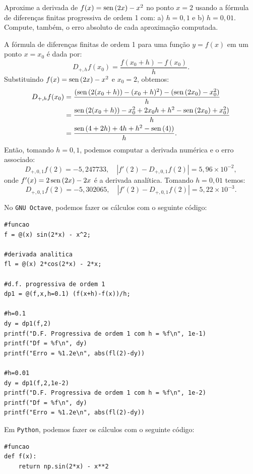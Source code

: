 \begin{exeresol}
Aproxime a derivada de $f(x)=\operatorname{sen}\,(2x) - x^2$ no ponto $x=2$ usando a fórmula de diferenças finitas progressiva de ordem 1 com: a) $h=0,1$ e b) $h=0,01$. Compute, também, o erro absoluto de cada aproximação computada.
\end{exeresol}
\begin{resol}
  A fórmula de diferenças finitas de ordem 1 para uma função $y = f(x)$ em um ponto $x = x_0$ é dada por:
  \begin{equation}
    D_{+,h}f(x_0) = \frac{f(x_0+h) - f(x_0)}{h}.
  \end{equation}
Substituindo $f(x) = \operatorname{sen}\,(2x) - x^2$ e $x_0 = 2$, obtemos:
  \begin{equation}
    \begin{split}
      D_{+,h}f(x_0) &= \frac{(\operatorname{sen}\,(2(x_0+h)) - (x_0+h)^2) - (\operatorname{sen}\,(2x_0) - x_0^2)}{h}\\
      &= \frac{\operatorname{sen}\,(2(x_0+h)) - x_0^2 + 2x_0h + h^2 - \operatorname{sen}\,(2x_0) + x_0^2)}{h}\\
      &= \frac{\operatorname{sen}\,(4+2h) + 4h + h^2 - \operatorname{sen}\,(4))}{h}.
    \end{split}
  \end{equation}
Então, tomando $h=0,1$, podemos computar a derivada numérica e o erro associado:
\begin{equation}
  D_{+,0,1}f(2) = -5,247733,\quad |f'(2)-D_{+,0,1}f(2)| = 5,96\times 10^{-2},
\end{equation}
onde $f'(x) = 2\operatorname{sen}\,(2x) - 2x$ é a derivada analítica. Tomando $h=0,01$ temos:
\begin{equation}
  D_{+,0,1}f(2) = -5,302065,\quad |f'(2)-D_{+,0,1}f(2)| = 5,22\times 10^{-3}.
\end{equation}

\ifisoctave
No \verb+GNU Octave+, podemos fazer os cálculos com o seguinte código:
\begin{verbatim}
#funcao
f = @(x) sin(2*x) - x^2;

#derivada analitica
fl = @(x) 2*cos(2*x) - 2*x;

#d.f. progressiva de ordem 1
dp1 = @(f,x,h=0.1) (f(x+h)-f(x))/h;

#h=0.1
dy = dp1(f,2)
printf("D.F. Progressiva de ordem 1 com h = %f\n", 1e-1)
printf("Df = %f\n", dy)
printf("Erro = %1.2e\n", abs(fl(2)-dy))

#h=0.01
dy = dp1(f,2,1e-2)
printf("D.F. Progressiva de ordem 1 com h = %f\n", 1e-2)
printf("Df = %f\n", dy)
printf("Erro = %1.2e\n", abs(fl(2)-dy))
\end{verbatim}
\fi
\ifispython
Em \verb+Python+, podemos fazer os cálculos com o seguinte código:
\begin{verbatim}
#funcao
def f(x):
    return np.sin(2*x) - x**2


\end{verbatim}
\end{resol}
